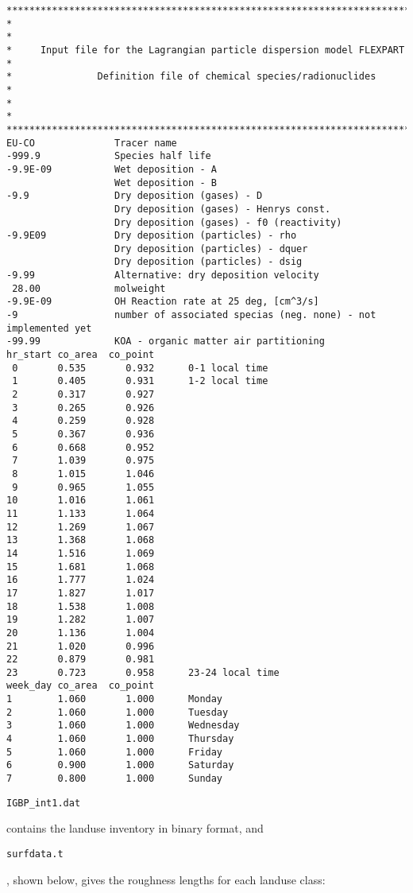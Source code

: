 \documentclass{egu}            %
\begin{document}
\begin{scriptsize}\begin{verbatim}
****************************************************************************
*                                                                          *
*     Input file for the Lagrangian particle dispersion model FLEXPART     *
*               Definition file of chemical species/radionuclides          *
*                                                                          *
****************************************************************************
EU-CO              Tracer name
-999.9             Species half life
-9.9E-09           Wet deposition - A
                   Wet deposition - B
-9.9               Dry deposition (gases) - D
                   Dry deposition (gases) - Henrys const.
                   Dry deposition (gases) - f0 (reactivity)
-9.9E09            Dry deposition (particles) - rho
                   Dry deposition (particles) - dquer
                   Dry deposition (particles) - dsig
-9.99              Alternative: dry deposition velocity
 28.00             molweight
-9.9E-09           OH Reaction rate at 25 deg, [cm^3/s]
-9                 number of associated specias (neg. none) - not implemented yet
-99.99             KOA - organic matter air partitioning
hr_start co_area  co_point
 0       0.535       0.932      0-1 local time
 1       0.405       0.931      1-2 local time
 2       0.317       0.927
 3       0.265       0.926
 4       0.259       0.928
 5       0.367       0.936
 6       0.668       0.952
 7       1.039       0.975
 8       1.015       1.046
 9       0.965       1.055
10       1.016       1.061
11       1.133       1.064
12       1.269       1.067
13       1.368       1.068
14       1.516       1.069
15       1.681       1.068
16       1.777       1.024
17       1.827       1.017
18       1.538       1.008
19       1.282       1.007
20       1.136       1.004
21       1.020       0.996
22       0.879       0.981
23       0.723       0.958      23-24 local time
week_day co_area  co_point
1        1.060       1.000      Monday
2        1.060       1.000      Tuesday
3        1.060       1.000      Wednesday
4        1.060       1.000      Thursday
5        1.060       1.000      Friday
6        0.900       1.000      Saturday
7        0.800       1.000      Sunday
\end{verbatim}\end{scriptsize}

\begin{footnotesize}\verb|IGBP_int1.dat|\end{footnotesize} contains the landuse inventory in binary format, and
\begin{footnotesize}\verb|surfdata.t|\end{footnotesize}, shown below, gives the roughness lengths for each landuse class:
\end{document}
